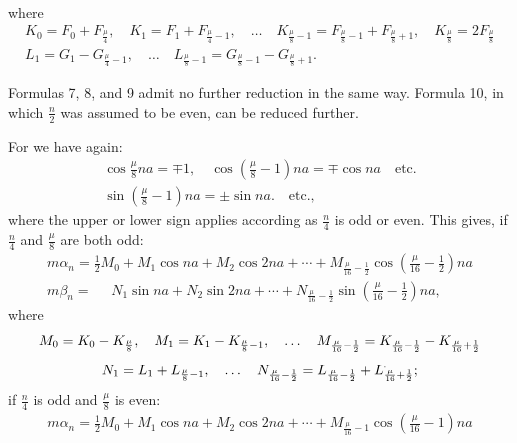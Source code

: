 \begin{landscape}
\[\begin{array}{l}
\end{array}
\]
where
\[
\begin{gathered}
K_0 = F_0 + F_{\frac{\mu}{4}}, \quad K_1 = F_1 + F_{\frac{\mu}{4}-1}, \quad \ldots \quad K_{\frac{\mu}{8}-1} = F_{\frac{\mu}{8}-1} + F_{\frac{\mu}{8}+1}, \quad K_{\frac{\mu}{8}} = 2F_{\frac{\mu}{8}}\\[4pt]
L_1 = G_1 - G_{\frac{\mu}{4}-1}, \quad \ldots \quad L_{\frac{\mu}{8}-1} = G_{\frac{\mu}{8}-1} - G_{\frac{\mu}{8}+1}.
\end{gathered}
\]
\par\noindent\hspace*{\parindent}Formulas 7, 8, and 9 admit no further reduction in the same way. Formula 10, in which \(\frac{n}{2}\) was assumed to be even, can be reduced further.
\par\noindent\hspace*{\parindent}For we have
again:
\[
\begin{gathered}
\cos\frac{\mu}{8}na = \mp 1, \quad \cos\left(\frac{\mu}{8}-1\right)na = \mp\cos na \quad \text{etc.}\\[4pt]
\sin\left(\frac{\mu}{8}-1\right)na = \pm\sin na\mathord{.}\quad \text{etc.,}
\end{gathered}
\]
where the upper or lower sign applies according as \(\frac{n}{4}\) is odd or even. This
gives, if \(\frac{n}{4}\)
and \(\frac{\mu}{8}\) are both odd:
\[
\tag*{11)}
\begin{array}{l}
m\alpha_n = \tfrac{1}{2}M_0 + M_1\cos na + M_2\cos 2na + \cdots + M_{\frac{\mu}{16}-\frac{1}{2}}\cos\left(\frac{\mu}{16}-\frac{1}{2}\right)na \\[4pt]
m\beta_n = \phantom{{}={}} N_1\sin na + N_2\sin 2na + \cdots + N_{\frac{\mu}{16}-\frac{1}{2}}\sin\left(\frac{\mu}{16}-\frac{1}{2}\right)na,
\end{array}
\]
where
\[
\begin{gathered}
M_0 = K_0 - K_{\frac{\mu}{8}}, \quad M_1 = K_1 - K_{\frac{\mu}{8}-1}, \quad \ldots \quad M_{\frac{\mu}{16}-\frac{1}{2}} = K_{\frac{\mu}{16}-\frac{1}{2}} - K_{\frac{\mu}{16}+\frac{1}{2}}\\[4pt]
N_1 = L_1 + L_{\frac{\mu}{8}-1}, \quad \ldots \quad N_{\frac{\mu}{16}-\frac{1}{2}} = L_{\frac{\mu}{16}-\frac{1}{2}} + \VtwoMarkedL_{\frac{\mu}{16}+\frac{1}{2}};
\end{gathered}
\]
if \(\frac{n}{4}\) is odd and \(\frac{\mu}{8}\) is even:
\[
\tag*{12)}
\begin{array}{l}
m\alpha_n = \tfrac{1}{2}M_0 + M_1\cos na + M_2\cos 2na + \cdots + M_{\frac{\mu}{16}-1}\cos\left(\frac{\mu}{16}-1\right)na \\[4pt]

\end{array}\]
\end{landscape}
